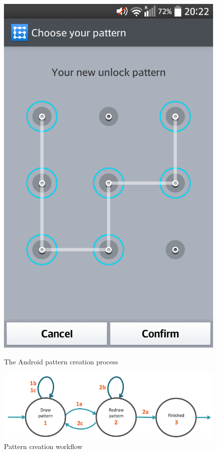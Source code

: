 \begin{figure}[H]
{        \includegraphics[scale=0.08]{pics/experiment/patternprocess1.png}
        \label{fig:confirmnewpattern}
      }
      \caption{The Android pattern creation process}
      \label{fig:androidpatterncreationprocess}
    \end{figure}

    \clearpage

    \begin{figure}[H]
      \centering
      \includegraphics[width=\textwidth]{pics/experiment/patterncreationflow.png}
      \caption{Pattern creation workflow}
      \label{fig:patterncreationworkflow}
    \end{figure}

